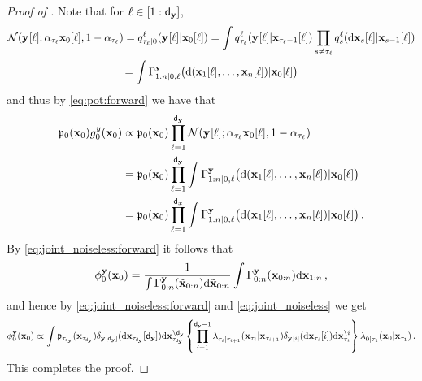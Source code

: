 \begin{proof}[Proof of ]
    Note that for $\ell \in [1:{\mathsf{d}_{\mathbf{y}}}]$,
    \begin{multline*}
        \normpdf(\vecidx{\diffltrmeas}{}{\ell}; \alpha_{\tau_\ell} \vecidx{\ltrstate}{0}{\ell}, 1 - \alpha_{\tau_\ell}) = \idxfwtrans{\tau_\ell | 0}{\vecidx{\ltrstate}{0}{\ell}}{\vecidx{\diffltrmeas}{}{\ell}}{\ell}
        =  \int \idxfwtrans{\tau_\ell}{\vecidx{\ltrstate}{\tau_{\ell} - 1}{\ell}}{\vecidx{\diffltrmeas}{}{\ell}}{\ell}  \prod_{s \neq \tau_\ell}  \idxfwtrans{s}{\vecidx{\ltrstate}{s-1}{\ell}}{\rmd \vecidx{\ltrstate}{s}{\ell}}{\ell} 
        \\ = \int \Gamma^{\diffltrmeas} _{1:n|0, \ell}\big(\rmd (\vecidx{\ltrstate}{1}{\ell}, \dotsc, \vecidx{\ltrstate}{n}{\ell}) |\vecidx{\ltrstate}{0}{\ell} \big) 
    \end{multline*}
    and thus by \eqref{eq:pot:forward} we have that 
    \begin{align*} 
        \bwmargV{0}{\ltrstate_0} \pot{0}{\lmeas}{\ltrstate_0} & \propto \bwmargV{0}{\ltrstate_0} \prod_{\ell = 1}^\dimtr \normpdf(\vecidx{\diffltrmeas}{}{\ell}; \alpha_{\tau_\ell} \vecidx{\ltrstate}{0}{\ell}, 1 - \alpha_{\tau_\ell}) \\
        & = \bwmargV{0}{\ltrstate_0} \prod_{\ell = 1}^\dimtr \int \Gamma^{\diffltrmeas} _{1:n|0, \ell}\big(\rmd (\vecidx{\ltrstate}{1}{\ell}, \dotsc, \vecidx{\ltrstate}{n}{\ell}) |\vecidx{\ltrstate}{0}{\ell} \big)  \\
        & = \bwmargV{0}{\ltrstate_0} \prod_{\ell = 1}^\dimx \int \Gamma^{\diffltrmeas} _{1:n|0, \ell}\big(\rmd (\vecidx{\ltrstate}{1}{\ell}, \dotsc, \vecidx{\ltrstate}{n}{\ell}) |\vecidx{\ltrstate}{0}{\ell} \big) \eqsp.
    \end{align*}
    By \eqref{eq:joint_noiseless:forward} it follows that 
    \[ 
        \filter{0}{\ltrmeas}{\ltrstate_0} = \frac{1}{\int \Gamma^{\diffltrmeas} _{0:n}(\chunk{\tilde\ltrstate}{0}{n}) \rmd \chunk{\tilde\ltrstate}{0}{n} }\int \Gamma^{\diffltrmeas} _{0:n}(\chunk{\ltrstate}{0}{n}) \rmd \chunk{\ltrstate}{1}{n} \eqsp,
    \]
    and hence by \eqref{eq:joint_noiseless:forward} and \eqref{eq:joint_noiseless} we get
    \[ 
        \noisyfilter{0}{\ltrmeas}{\ltrstate_{0}} \propto
    \int \bwmargV{\tau_\dimtr}{\ltrstate_{\tau_\dimtr}} \delta_{\vecidx{\diffltrmeas}{}{\dimtr}}(\rmd \vecidx{\ltrstate}{\tau_\dimtr}{\dimtr}) \rmd \projidx{\ltrstate}{\tau_\dimtr}{\dimtr} \left\{ \prod_{i = 1}^{\dimtr-1} \bwtransV{}{\tau_i | \tau_{i + 1}}{\ltrstate_{\tau_{i+1}}}{\ltrstate_{\tau_{i}}} \delta_{\vecidx{\diffltrmeas}{}{i}}(\rmd \vecidx{\ltrstate}{\tau_i}{i}) \rmd \projidx{\ltrstate}{\tau_i}{i} \right\} \bwtransV{}{0|\tau_1}{\ltrstate_{\tau_1}}{\ltrstate_0} \eqsp. \]
    This completes the proof.
\end{proof} 
